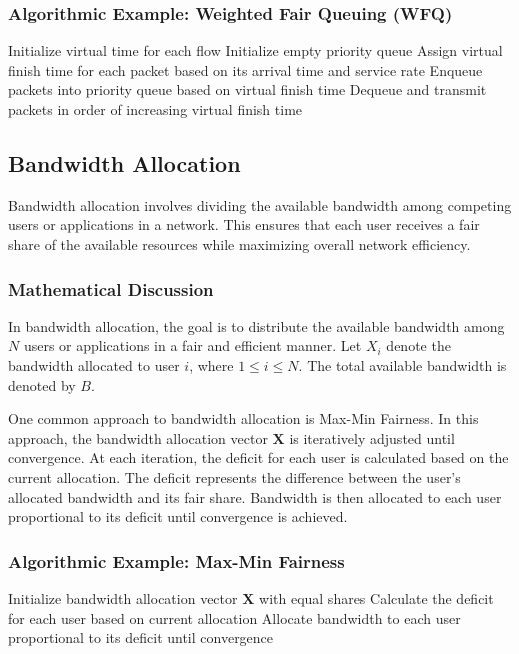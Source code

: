 \documentclass[12pt]{book} %
\begin{document}
\subsubsection{Algorithmic Example: Weighted Fair Queuing (WFQ)}
\FloatBarrier
\begin{algorithm}[H]
\caption{Weighted Fair Queuing (WFQ)}
\begin{algorithmic}[1]
\State Initialize virtual time for each flow
\State Initialize empty priority queue
    \State Assign virtual finish time for each packet based on its arrival time and service rate
    \State Enqueue packets into priority queue based on virtual finish time
    \State Dequeue and transmit packets in order of increasing virtual finish time
\EndWhile
\end{algorithmic}
\end{algorithm}
\FloatBarrier

\subsection{Bandwidth Allocation}

Bandwidth allocation involves dividing the available bandwidth among competing users or applications in a network. This ensures that each user receives a fair share of the available resources while maximizing overall network efficiency.

\subsubsection{Mathematical Discussion}

In bandwidth allocation, the goal is to distribute the available bandwidth among $N$ users or applications in a fair and efficient manner. Let $X_i$ denote the bandwidth allocated to user $i$, where $1 \leq i \leq N$. The total available bandwidth is denoted by $B$.

One common approach to bandwidth allocation is Max-Min Fairness. In this approach, the bandwidth allocation vector $\mathbf{X}$ is iteratively adjusted until convergence. At each iteration, the deficit for each user is calculated based on the current allocation. The deficit represents the difference between the user's allocated bandwidth and its fair share. Bandwidth is then allocated to each user proportional to its deficit until convergence is achieved.

\subsubsection{Algorithmic Example: Max-Min Fairness}
\FloatBarrier
\begin{algorithm}[H]
\caption{Max-Min Fairness}
\begin{algorithmic}[1]
\State Initialize bandwidth allocation vector $\mathbf{X}$ with equal shares
    \State Calculate the deficit for each user based on current allocation
    \State Allocate bandwidth to each user proportional to its deficit until convergence
\EndWhile
\end{algorithmic}
\end{algorithm}
\FloatBarrier
\end{document}
